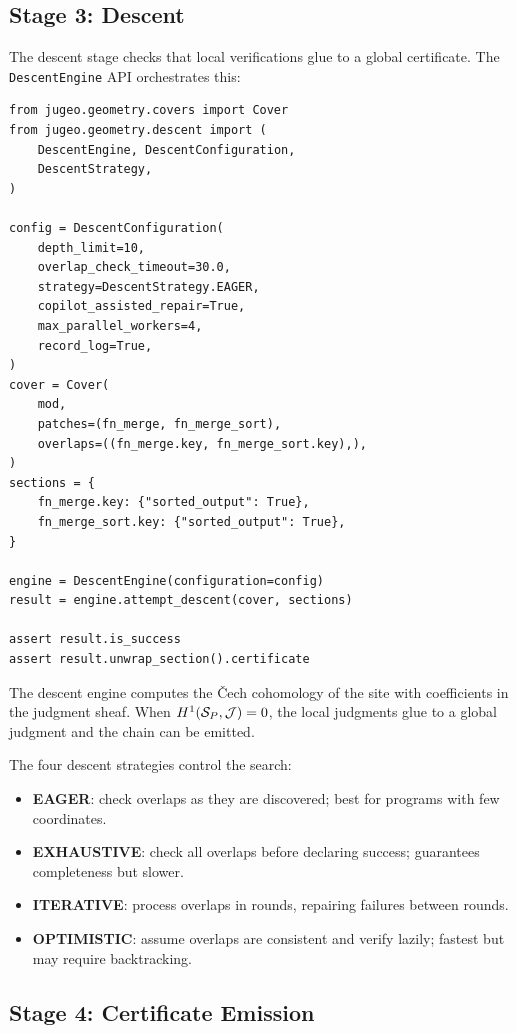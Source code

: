 \documentclass[11pt]{article}
\begin{document}
\subsection{Stage 3: Descent}\label{ssec:descent}

The descent stage checks that local verifications glue to a global
certificate.  The \texttt{DescentEngine} API orchestrates this:

\begin{lstlisting}[style=jugeo-python,caption={Descent configuration and execution.}]
from jugeo.geometry.covers import Cover
from jugeo.geometry.descent import (
    DescentEngine, DescentConfiguration,
    DescentStrategy,
)

config = DescentConfiguration(
    depth_limit=10,
    overlap_check_timeout=30.0,
    strategy=DescentStrategy.EAGER,
    copilot_assisted_repair=True,
    max_parallel_workers=4,
    record_log=True,
)
cover = Cover(
    mod,
    patches=(fn_merge, fn_merge_sort),
    overlaps=((fn_merge.key, fn_merge_sort.key),),
)
sections = {
    fn_merge.key: {"sorted_output": True},
    fn_merge_sort.key: {"sorted_output": True},
}

engine = DescentEngine(configuration=config)
result = engine.attempt_descent(cover, sections)

assert result.is_success
assert result.unwrap_section().certificate
\end{lstlisting}

The descent engine computes the \v{C}ech cohomology of the site
with coefficients in the judgment sheaf.  When $H^{1}(\mathcal{S}_P,
\mathcal{J}) = 0$, the local judgments glue to a global judgment and the
chain can be emitted.

The four descent strategies control the search:
\begin{itemize}
  \item \textbf{EAGER}: check overlaps as they are discovered;
    best for programs with few coordinates.
  \item \textbf{EXHAUSTIVE}: check all overlaps before declaring
    success; guarantees completeness but slower.
  \item \textbf{ITERATIVE}: process overlaps in rounds, repairing
    failures between rounds.
  \item \textbf{OPTIMISTIC}: assume overlaps are consistent and
    verify lazily; fastest but may require backtracking.
\end{itemize}

\subsection{Stage 4: Certificate Emission}\label{ssec:emission}
\end{document}
